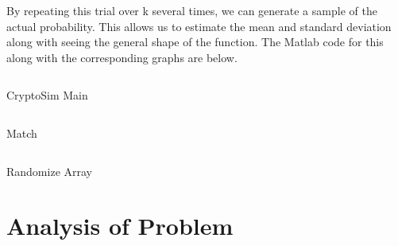 \documentclass{article}
\begin{document}
      By repeating this trial over k several times, we can generate
      a sample of the actual probability. This allows us to estimate
      the mean and standard deviation along with seeing the general
      shape of the function. The Matlab code for this along with
      the corresponding graphs are below.

      \begin{listing}[H]
         \inputminted[linenos]{matlab}{../../crypto_sim.m}
         \caption{CryptoSim Main}
      \end{listing}
      \begin{listing}[H]
         \inputminted[linenos]{matlab}{../../match.m}
         \caption{Match}
      \end{listing}
      \begin{listing}[H]
         \inputminted[linenos]{matlab}{../../randomize_array.m}
         \caption{Randomize Array}
      \end{listing}
   \section{Analysis of Problem}
\end{document}
